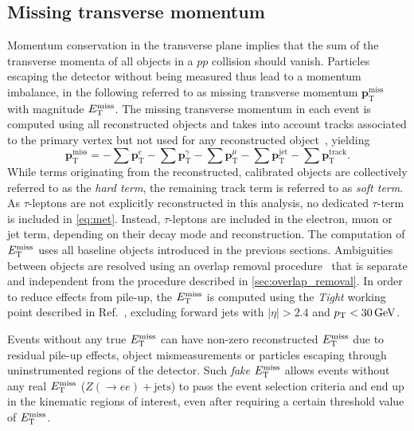 \subsection{Missing transverse momentum}

Momentum conservation in the transverse plane implies that the sum of the transverse momenta of all objects in a $pp$ collision should vanish.
Particles escaping the detector without being measured thus lead to a momentum imbalance, in the following referred to as missing transverse momentum $\boldsymbol{p}^{\textrm{miss}}_\textrm{T}$ with magnitude $E_{\textrm{T}}^{\textrm{miss}}$.
The missing transverse momentum in each event is computed using all reconstructed objects and takes into account tracks associated to the primary vertex but not used for any reconstructed object~\cite{PERF-2016-07}, yielding
\begin{equation}
	\boldsymbol{p}^{\textrm{miss}}_\textrm{T} = - \sum\boldsymbol{p}^{e}_{\textrm{T}} - \sum\boldsymbol{p}^{\gamma}_{\textrm{T}} - \sum\boldsymbol{p}^{\mu}_{\textrm{T}} - \sum\boldsymbol{p}^{\mathrm{jet}}_{\textrm{T}} - \sum\boldsymbol{p}^{\mathrm{track}}_{\textrm{T}}.
	\label{eq:met}
\end{equation}
While terms originating from the reconstructed, calibrated objects are collectively referred to as the \textit{hard term}, the remaining track term is referred to as \textit{soft term}.
As $\tau$-leptons are not explicitly reconstructed in this analysis, no dedicated $\tau$-term is included in \cref{eq:met}. Instead, $\tau$-leptons are included in the electron, muon or jet term, depending on their decay mode and reconstruction. The computation of $E_{\textrm{T}}^{\textrm{miss}}$ uses all baseline objects introduced in the previous sections. Ambiguities between objects are resolved using an overlap removal procedure~\cite{PERF-2016-07} that is separate and independent from the procedure described in \cref{sec:overlap_removal}. In order to reduce effects from pile-up, the $E_{\textrm{T}}^{\textrm{miss}}$ is computed using the \textit{Tight} working point described in Ref.~\cite{ATLAS-CONF-2018-023}, excluding forward jets with $\vert\eta\vert > 2.4$ and $\pt < \SI{30}{\GeV}$.

Events without any true $E_{\textrm{T}}^{\textrm{miss}}$ can have non-zero reconstructed $E_{\textrm{T}}^{\textrm{miss}}$ due to residual pile-up effects, object mismeasurements or particles escaping through uninstrumented regions of the detector. Such \textit{fake} $E_{\textrm{T}}^{\textrm{miss}}$ allows events without any real $E_{\textrm{T}}^{\textrm{miss}}$ (\eg $Z(\rightarrow ee)+\mathrm{jets}$) to pass the event selection criteria and end up in the kinematic regions of interest, even after requiring a certain threshold value of $E_{\textrm{T}}^{\textrm{miss}}$.


